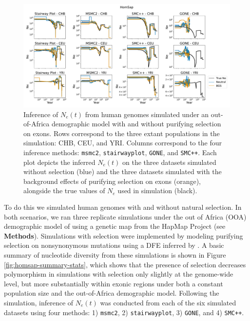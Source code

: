 \documentclass[hidelinks]{article}
\newcommand{\msmc}{\texttt{msmc2}\xspace}
\newcommand{\stairway}{\texttt{stairwayplot}\xspace}
\newcommand{\gone}{\texttt{GONE}\xspace}
\newcommand{\smcpp}{\texttt{SMC++}\xspace}
\begin{document}
    
    \begin{figure}[b!]
        \centering
        \includegraphics[width=\textwidth]{figures/HomSap/OOA/estimated_Ne_t_final}
        \caption{
        \label{fig:human-demography}
        Inference of $N_e(t)$ from human genomes simulated under an out-of-Africa demographic model \citep{ragsdale2019models}
        with and without purifying selection on exons. 
        Rows correspond to the three extant populations in the simulation: CHB, CEU, and YRI.
        Columns correspond to the four inference methods:    
        \msmc \citep{Schiffels2020}, \stairway \citep{liu2020stairway}, \gone \citep{santiago2020recent}, and \smcpp \citep{terhorst2017robust}.
        Each plot depicts the inferred $N_e(t)$ on the three datasets simulated without selection (blue)
        and the three datasets simulated with the background effects of purifying selection on exons (orange),
        alongside the true values of $N_e$ used in simulation (black).
        }
    \end{figure}

    To do this we simulated human genomes with and without natural selection.
    In both scenarios, we ran three replicate simulations
    under the out of Africa (OOA) demographic model of
    \citep{ragsdale2019models} using a genetic map from the HapMap Project \citep{international2007second} (see \textbf{Methods}).
    Simulations with selection were implemented by modeling purifying selection on nonsynonymous mutations
    using a DFE inferred by \citet{kim2017inference}.
    A basic summary of nucleotide diversity from these simulations is shown in Figure \ref{fig:homsap-summary-stats},
    which shows that the presence of selection decreases polymorphism in simulations with selection only slightly
    at the genome-wide level, but more substantially within exonic regions under both a constant population size
    and the out-of-Africa demographic model.
    Following the simulation, inference of $N_e(t)$ was conducted from each of the six simulated datasets using four methods: 1) \msmc \citep{Schiffels2020}, 
    2) \stairway \citep{liu2020stairway}, 3) \gone \citep{santiago2020recent}, and 4) \smcpp \citep{terhorst2017robust}.
\end{document}
